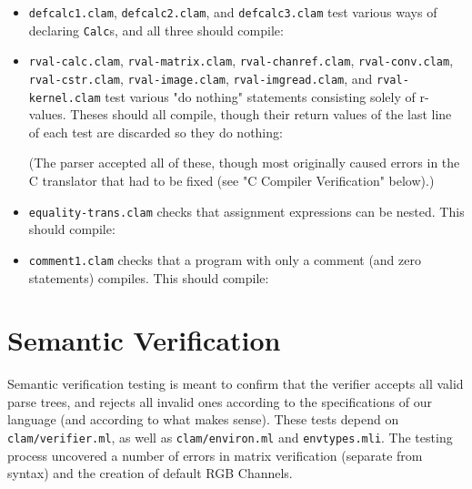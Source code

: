 \begin{itemize}
\item \texttt{defcalc1.clam}, \texttt{defcalc2.clam}, and \texttt{defcalc3.clam} test various ways of declaring \texttt{Calc}s,
and all three should compile:




\item \texttt{rval-calc.clam}, \texttt{rval-matrix.clam}, \texttt{rval-chanref.clam}, \texttt{rval-conv.clam},
\texttt{rval-cstr.clam}, \texttt{rval-image.clam}, \texttt{rval-imgread.clam}, and \texttt{rval-kernel.clam}
test various "do nothing" statements consisting solely of r-values. Theses should all compile, though their
return values of the last line of each test are discarded so they do nothing:








(The parser accepted all of these, though most originally caused errors in the C translator
that had to be fixed (see "C Compiler Verification" below).)

\item \texttt{equality-trans.clam} checks that assignment expressions can be nested. This should compile:


\item \texttt{comment1.clam} checks that a program with only a comment (and zero statements) compiles. This should compile:


\end{itemize}

\section{Semantic Verification}
\label{testing:semantic}

Semantic verification testing is meant to confirm that the verifier accepts all valid parse trees,
and rejects all invalid ones according to the specifications of our language
(and according to what makes sense).
These tests depend on \texttt{clam/verifier.ml}, as well as \texttt{clam/environ.ml} and \texttt{envtypes.mli}. 
The testing process uncovered a number of errors in matrix verification (separate from syntax)
and the creation of default RGB Channels.\\

